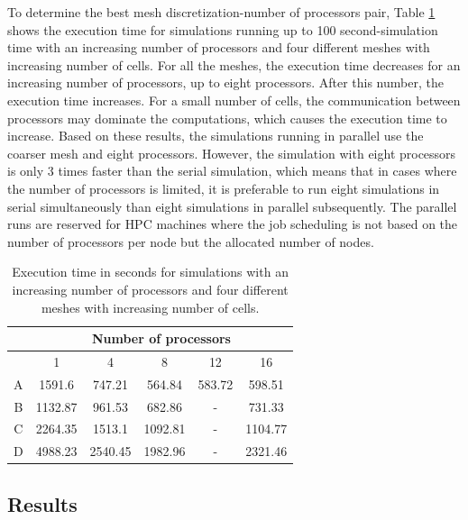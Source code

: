 To determine the best mesh discretization-number of processors pair, Table \ref{tab:serial-parallel} shows the execution time for simulations running up to 100 second-simulation time with an increasing number of processors and four different meshes with increasing number of cells.
For all the meshes, the execution time decreases for an increasing number of processors, up to eight processors.
After this number, the execution time increases.
For a small number of cells, the communication between processors may dominate the computations, which causes the execution time to increase.
Based on these results, the simulations running in parallel use the coarser mesh and eight processors.
However, the simulation with eight processors is only 3 times faster than the serial simulation, which means that in cases where the number of processors is limited, it is preferable to run eight simulations in serial simultaneously than eight simulations in parallel subsequently.
The parallel runs are reserved for \gls*{HPC} machines where the job scheduling is not based on the number of processors per node but the allocated number of nodes.

\begin{table}[htbp!]
  \centering
  \caption{Execution time in seconds for simulations with an increasing number of processors and four different meshes with increasing number of cells.}
  \label{tab:serial-parallel}
\begin{tabular}{c|ccccc}
 \toprule
    & \multicolumn{5}{c}{Number of processors}       \\
 \midrule
    & 1       & 4       & 8       & 12     & 16      \\
 \midrule
  A & 1591.6  & 747.21  & 564.84  & 583.72 & 598.51  \\
  B & 1132.87 & 961.53  & 682.86  & -      & 731.33  \\
  C & 2264.35 & 1513.1  & 1092.81 & -      & 1104.77 \\
  D & 4988.23 & 2540.45 & 1982.96 & -      & 2321.46 \\
 \bottomrule
\end{tabular}
\end{table}


\subsection{Results}

